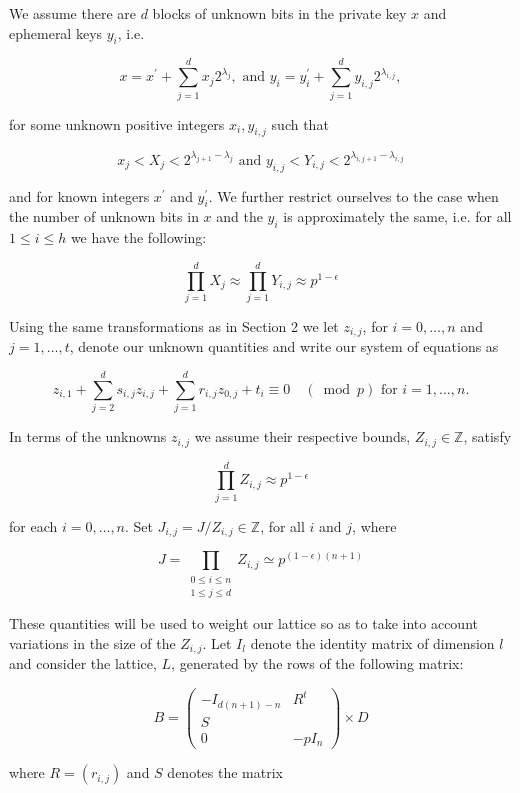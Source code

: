 \documentclass[10pt]{article}
\begin{document}
We assume there are $d$ blocks of unknown bits in the private key $x$ and ephemeral keys $y_{i}$, i.e.

$$
x=x^{\prime}+\sum_{j=1}^{d} x_{j} 2^{\lambda_{j}}, \text { and } y_{i}=y_{i}^{\prime}+\sum_{j=1}^{d} y_{i, j} 2^{\lambda_{i, j}},
$$

for some unknown positive integers $x_{i}, y_{i, j}$ such that

$$
x_{j}<X_{j}<2^{\lambda_{j+1}-\lambda_{j}} \text { and } y_{i, j}<Y_{i, j}<2^{\lambda_{i, j+1}-\lambda_{i, j}}
$$

and for known integers $x^{\prime}$ and $y_{i}^{\prime}$. We further restrict ourselves to the case when the number of unknown bits in $x$ and the $y_{i}$ is approximately the same, i.e. for all $1 \leq i \leq h$ we have the following:

$$
\prod_{j=1}^{d} X_{j} \approx \prod_{j=1}^{d} Y_{i, j} \approx p^{1-\epsilon}
$$

Using the same transformations as in Section 2 we let $z_{i, j}$, for $i=0, \ldots, n$ and $j=1, \ldots, t$, denote our unknown quantities and write our system of equations as

$$
z_{i, 1}+\sum_{j=2}^{d} s_{i, j} z_{i, j}+\sum_{j=1}^{d} r_{i, j} z_{0, j}+t_{i} \equiv 0 \quad(\bmod p) \text { for } i=1, \ldots, n .
$$

In terms of the unknowns $z_{i, j}$ we assume their respective bounds, $Z_{i, j} \in \mathbb{Z}$, satisfy

$$
\prod_{j=1}^{d} Z_{i, j} \approx p^{1-\epsilon}
$$

for each $i=0, \ldots, n$. Set $J_{i, j}=J / Z_{i, j} \in \mathbb{Z}$, for all $i$ and $j$, where

$$
J=\prod_{\substack{0 \leq i \leq n \\ 1 \leq j \leq d}} Z_{i, j} \simeq p^{(1-\epsilon)(n+1)}
$$

These quantities will be used to weight our lattice so as to take into account variations in the size of the $Z_{i, j}$. Let $I_{l}$ denote the identity matrix of dimension $l$ and consider the lattice, $L$, generated by the rows of the following matrix:

$$
B=\left(\begin{array}{c|c}
-I_{d(n+1)-n} & R^{t} \\
S \\
\hline 0 & -p I_{n}
\end{array}\right) \times D
$$

where $R=\left(r_{i, j}\right)$ and $S$ denotes the matrix
\end{document}
